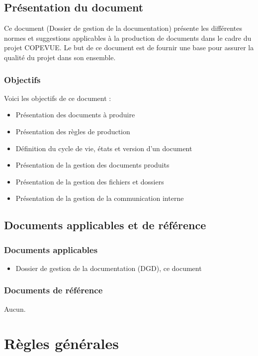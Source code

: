 \section{Présentation du document}

Ce document (Dossier de gestion de la documentation) présente les différentes normes et suggestions applicables à la production de documents dans le cadre du projet COPEVUE. Le but de ce document est de fournir une base pour assurer la qualité du projet dans son ensemble.

\subsection{Objectifs}

Voici les objectifs de ce document :
\begin{itemize}
\item Présentation des documents à produire
\item Présentation des règles de production
\item Définition du cycle de vie, états et version d'un document
\item Présentation de la gestion des documents produits
\item Présentation de la gestion des fichiers et dossiers
\item Présentation de la gestion de la communication interne
\end{itemize}

\section{Documents applicables et de référence}

\subsection{Documents applicables}

\begin{itemize}
\item Dossier de gestion de la documentation (DGD), ce document
\end{itemize}

\subsection{Documents de référence}

Aucun.

\chapter{Règles générales}

